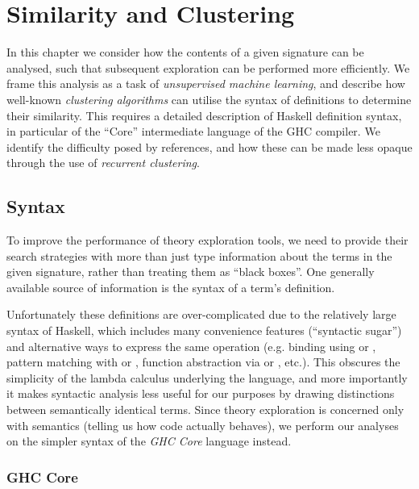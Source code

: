 \chapter{Similarity and Clustering}
\label{sec:recurrentclustering}

\iffalse TODO: Alison: Each chapter should have a description at the start (see
bucketing ``in this chapter'') \fi

In this chapter we consider how the contents of a given signature can be
analysed, such that subsequent exploration can be performed more efficiently. We
frame this analysis as a task of \emph{unsupervised machine learning}, and
describe how well-known \emph{clustering algorithms} can utilise the syntax of
definitions to determine their similarity. This requires a detailed description
of Haskell definition syntax, in particular of the ``Core'' intermediate
language of the GHC compiler. We identify the difficulty posed by references,
and how these can be made less opaque through the use of \emph{recurrent
  clustering}.

\section{Syntax}

To improve the performance of theory exploration tools, we need to provide their
search strategies with more than just type information about the terms in the
given signature, rather than treating them as ``black boxes''. One generally
available source of information is the syntax of a term's definition.

Unfortunately these definitions are over-complicated due to the relatively large
syntax of Haskell, which includes many convenience features (``syntactic
sugar'') and alternative ways to express the same operation (e.g. binding using
 or , pattern matching with  or , function
abstraction via  or , etc.). This obscures the
simplicity of the lambda calculus underlying the language, and more importantly
it makes syntactic analysis less useful for our purposes by drawing distinctions
between semantically identical terms. Since theory exploration is concerned only
with semantics (telling us how code actually behaves), we perform our analyses
on the simpler syntax of the \emph{GHC Core} language instead.

\subsection{GHC Core}\label{sec:core}
\label{sec:ghccore}


